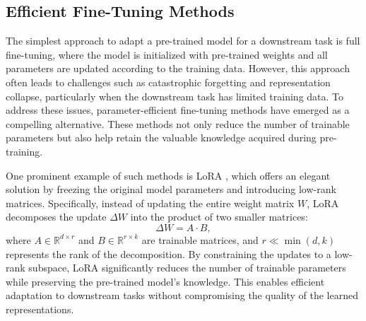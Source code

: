 \subsection{Efficient Fine-Tuning Methods}

The simplest approach to adapt a pre-trained model for a downstream task is full fine-tuning, where the model is initialized with pre-trained weights and all parameters are updated according to the training data. However, this approach often leads to challenges such as catastrophic forgetting \cite{kemker2017measuring} and representation collapse, particularly when the downstream task has limited training data. To address these issues, parameter-efficient fine-tuning methods have emerged as a compelling alternative. These methods not only reduce the number of trainable parameters but also help retain the valuable knowledge acquired during pre-training.

One prominent example of such methods is LoRA \cite{hu2021lora}, which offers an elegant solution by freezing the original model parameters and introducing low-rank matrices. Specifically, instead of updating the entire weight matrix $W$, LoRA decomposes the update $\Delta W$ into the product of two smaller matrices:
\begin{equation}
    \Delta W = A \cdot B,
\end{equation}
where $A \in \mathbb{R}^{d \times r}$ and $B \in \mathbb{R}^{r \times k}$ are trainable matrices, and $r \ll \min(d, k)$ represents the rank of the decomposition. By constraining the updates to a low-rank subspace, LoRA significantly reduces the number of trainable parameters while preserving the pre-trained model's knowledge. This enables efficient adaptation to downstream tasks without compromising the quality of the learned representations.
